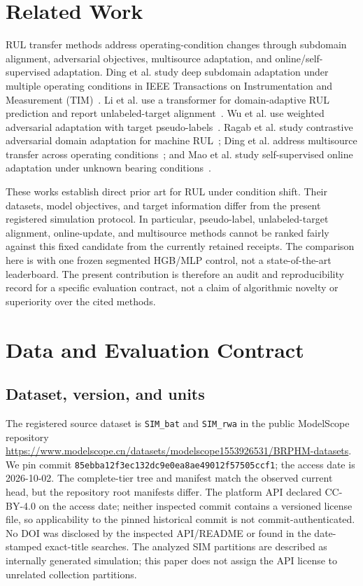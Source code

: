 \documentclass[journal]{IEEEtran}
\begin{document}
\section{Related Work}\label{sec:related}
RUL transfer methods address operating-condition changes through subdomain alignment, adversarial objectives, multisource adaptation, and online/self-supervised adaptation. Ding et al. study deep subdomain adaptation under multiple operating conditions in IEEE Transactions on Instrumentation and Measurement (TIM)~\cite{ding2021tim}. Li et al. use a transformer for domain-adaptive RUL prediction and report unlabeled-target alignment~\cite{li2022tim}. Wu et al. use weighted adversarial adaptation with target pseudo-labels~\cite{wu2022tim}. Ragab et al. study contrastive adversarial domain adaptation for machine RUL~\cite{ragab2021tii}; Ding et al. address multisource transfer across operating conditions~\cite{ding2022tmech}; and Mao et al. study self-supervised online adaptation under unknown bearing conditions~\cite{mao2023tii}.

These works establish direct prior art for RUL under condition shift. Their datasets, model objectives, and target information differ from the present registered simulation protocol. In particular, pseudo-label, unlabeled-target alignment, online-update, and multisource methods cannot be ranked fairly against this fixed candidate from the currently retained receipts. The comparison here is with one frozen segmented HGB/MLP control, not a state-of-the-art leaderboard. The present contribution is therefore an audit and reproducibility record for a specific evaluation contract, not a claim of algorithmic novelty or superiority over the cited methods.

\section{Data and Evaluation Contract}\label{sec:data}
\subsection{Dataset, version, and units}
The registered source dataset is \texttt{SIM\_bat} and \texttt{SIM\_rwa} in the public ModelScope repository \url{https://www.modelscope.cn/datasets/modelscope1553926531/BRPHM-datasets}. We pin commit \texttt{85ebba12\allowbreak f3ec132d\allowbreak c9e0ea8a\allowbreak e49012f5\allowbreak 7505ccf1}; the access date is 2026-10-02. The complete-tier tree and manifest match the observed current head, but the repository root manifests differ. The platform API declared CC-BY-4.0 on the access date; neither inspected commit contains a versioned license file, so applicability to the pinned historical commit is not commit-authenticated. No DOI was disclosed by the inspected API/README or found in the date-stamped exact-title searches. The analyzed SIM partitions are described as internally generated simulation; this paper does not assign the API license to unrelated collection partitions.
\end{document}
